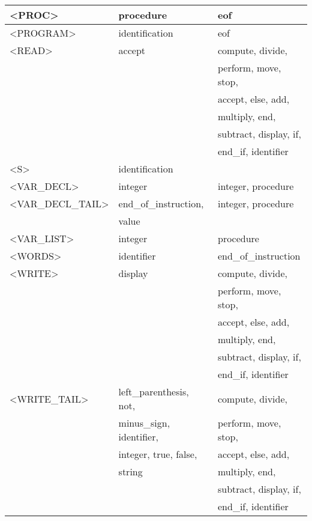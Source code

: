 \begin{longtable}{|l|l|l|}
  \hline
<PROC>  &  procedure&   eof\\ 
  \hline
<PROGRAM>  &  identification&   eof\\ 
  \hline
<READ>  &  accept&   compute, divide, \\ 
  &  &   perform, move, stop, \\ 
  &  &   accept, else, add, \\ 
  &  &   multiply, end, \\ 
  &  &   subtract, display, if, \\ 
  &  &   end\_if, identifier\\ 
  \hline
<S>  &  identification&   \\ 
  \hline
<VAR\_DECL>  &  integer&   integer, procedure\\ 
  \hline
<VAR\_DECL\_TAIL>  &  end\_of\_instruction, &   integer, procedure\\ 
  &  value&   \\ 
  \hline
<VAR\_LIST>  &  integer&   procedure\\ 
  \hline
<WORDS>  &  identifier&   end\_of\_instruction\\ 
  \hline
<WRITE>  &  display&   compute, divide, \\ 
  &  &   perform, move, stop, \\ 
  &  &   accept, else, add, \\ 
  &  &   multiply, end, \\ 
  &  &   subtract, display, if, \\ 
  &  &   end\_if, identifier\\ 
  \hline
<WRITE\_TAIL>  &  left\_parenthesis, not, &   compute, divide, \\ 
  &  minus\_sign, identifier, &   perform, move, stop, \\ 
  &  integer, true, false, &   accept, else, add, \\ 
  &  string&   multiply, end, \\ 
  &  &   subtract, display, if, \\ 
  &  &   end\_if, identifier\\ 
  \hline
\end{longtable}

